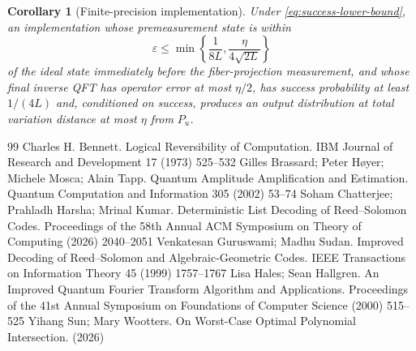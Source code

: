 \documentclass[10pt,a4paper]{amsart}
\newtheorem{corollary}[theorem]{Corollary}
\begin{document}
\begin{corollary}[Finite-precision implementation]
\label{cor:finite-precision}
Under \cref{eq:success-lower-bound}, an implementation whose premeasurement state is within
\begin{equation}
   \varepsilon\le
   \min\left\{\frac1{8L},\frac{\eta}{4\sqrt{2L}}\right\}
   \label{eq:precision-choice}
\end{equation}
of the ideal state immediately before the fiber-projection measurement, and whose final inverse QFT has operator error at most $\eta/2$, has success probability at least $1/(4L)$ and, conditioned on success, produces an output distribution at total variation distance at most $\eta$ from $P_u$.
\end{corollary}


\begin{thebibliography}{99}
 Charles H. Bennett. Logical Reversibility of Computation. IBM Journal of Research and Development 17 (1973) 525--532
 Gilles Brassard; Peter H{\o}yer; Michele Mosca; Alain Tapp. Quantum Amplitude Amplification and Estimation. Quantum Computation and Information 305 (2002) 53--74
 Soham Chatterjee; Prahladh Harsha; Mrinal Kumar. Deterministic List Decoding of {Reed--Solomon} Codes. Proceedings of the 58th Annual ACM Symposium on Theory of Computing (2026) 2040--2051
 Venkatesan Guruswami; Madhu Sudan. Improved Decoding of {Reed--Solomon} and Algebraic-Geometric Codes. IEEE Transactions on Information Theory 45 (1999) 1757--1767
 Lisa Hales; Sean Hallgren. An Improved {Quantum Fourier Transform} Algorithm and Applications. Proceedings of the 41st Annual Symposium on Foundations of Computer Science (2000) 515--525
 Yihang Sun; Mary Wootters. On Worst-Case Optimal Polynomial Intersection. (2026)
\end{thebibliography}
\end{document}
